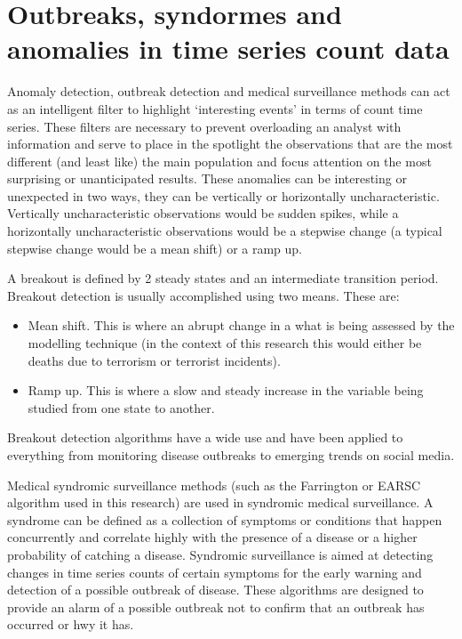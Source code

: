 \section{Outbreaks, syndormes and anomalies in  time series count data} 
Anomaly detection, outbreak detection and medical surveillance methods can act as an intelligent filter to highlight ‘interesting events’ in terms of count time series. These filters are necessary to prevent overloading  an analyst with information and serve to place in the spotlight the observations that are the most different (and least like) the main population and focus attention on the most surprising or unanticipated results. These anomalies can be interesting or unexpected in two ways, they can be vertically or horizontally uncharacteristic. Vertically uncharacteristic observations would be sudden spikes, while a horizontally uncharacteristic observations would be a stepwise change (a typical stepwise change would be a mean shift) or a ramp up.

A breakout is defined by 2 steady states and an intermediate transition period. Breakout detection is usually accomplished using two means. These are:
\begin{itemize}
\item Mean shift. This is where an abrupt change in a what is being assessed by the modelling technique (in the context of this research this would either be deaths due to terrorism or terrorist incidents). 
\item Ramp up. This is where a slow and steady increase in the variable being studied from one state to another.
\end{itemize}

Breakout detection algorithms have a wide use and have been applied to everything from monitoring disease outbreaks to emerging trends on social media.

Medical syndromic surveillance methods (such as the Farrington or EARSC algorithm used in this research) are used in syndromic medical surveillance. A syndrome can be defined as a collection of symptoms or conditions that happen concurrently and correlate highly with the presence of a disease or a  higher probability of catching a disease. Syndromic surveillance is aimed at detecting changes in time series counts of certain symptoms for the early warning and detection of a possible outbreak of disease. These algorithms are designed to provide an alarm of a possible outbreak not to confirm that an outbreak has occurred or hwy it has.

